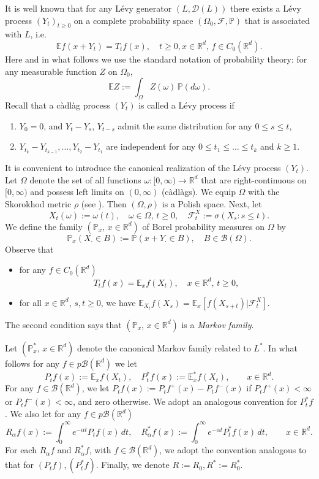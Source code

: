 \documentclass[11pt,a4paper,reqno]{amsart}
\newcommand{\FF}{{\mathcal  F}}
\theoremstyle{definition}
\numberwithin{equation}{section}
\begin{document}
It is well known that for any L\'evy generator $(L,\mathscr D(L))$ there exists a L\'evy process $(Y_t)_{t\ge 0}$
on a complete probability space $(\Omega_0,\mathcal F,\mathbb P)$ that is associated with  $L$, i.e.
\[
\mathbb Ef(x+Y_t)=T_tf(x),\quad t\ge 0,x\in\mathbb R^d,\, f\in C_0(\mathbb R^d).
\]
Here and in what follows we use the standard  notation of probability theory: 
 for any measurable function $Z$ on $\Omega_0$,
\[
\mathbb EZ:=\int_{\Omega}Z(\omega)\,\mathbb P(d\omega).
\]
Recall that a c\`adl\`ag process $(Y_t)$ is called a L\'evy process if
\begin{enumerate}
\item[(i)] $Y_0=0$, and   $Y_t-Y_s$,  $Y_{t-s}$ admit the same distribution  for any $0\le s\le t$,
\item[(ii)] $Y_{t_k}-Y_{t_{k-1}},\dots,Y_{t_2}-Y_{t_1}$ are independent for any $0\le t_1\le \dots\le t_k$ and $k\ge 1$.
\end{enumerate}
It is convenient  to introduce the canonical realization of the L\'evy process $(Y_t)$.
Let $\Omega$ denote the set of all functions $\omega:[0,\infty)\to \mathbb R^d$
that are  right-continuous on $[0,\infty)$ and possess left limits on $(0,\infty)$ (c\`adl\`ags).
We equip $\Omega$ with the Skorokhod metric $\rho$ (see  \cite[Section 12]{bil}). 
Then $(\Omega,\rho)$ is a Polish space.
Next, let 
\[
X_t(\omega):=\omega(t),\quad \omega\in \Omega,\, t\ge 0,\quad \mathcal F^X_t:=\sigma(X_s: s\le t).
\]
We define the family  $(\mathbb P_x,\, x\in \mathbb R^d)$ 
of Borel probability measures on $\Omega$ by
\[
\mathbb P_x(X_\cdot \in B):= \mathbb P(x+Y_\cdot\in B),\quad B\in\mathcal B(\Omega).
\]
Observe that 
\begin{itemize}
\item for any $f\in C_0(\mathbb R^d)$
\[
T_tf(x)=\mathbb E_xf(X_t),\quad x\in\mathbb R^d,\, t\ge 0,
\]
\item for all $x\in\mathbb R^d$, $s,t\ge 0$, we have  $\mathbb E_{X_t}f(X_s)=\mathbb E_x[f(X_{s+t})|\FF_t^X]$.
\end{itemize}
The second condition says that $(\mathbb P_x,\, x\in \mathbb R^d)$ is a {\em Markov family}.




Let $(\mathbb P^{*}_x,\, x\in \mathbb R^d)$ 
denote the canonical Markov family  related to $L^*$.
In what follows for   any  $f\in p\mathscr B(\mathbb R^d)$  we let
\[
P_tf(x):=\mathbb E_x f(X_t),\quad P^{*}_tf(x):=\mathbb E^{*}_x f(X_t),\qquad x\in \mathbb R^d.
\]
For any  $f\in\mathscr B(\mathbb R^d)$, we let
$P_tf(x):= P_tf^+(x)-P_tf^-(x)$ if $P_tf^+(x)<\infty$ or $P_tf^-(x)<\infty$, and zero otherwise.
We adopt   an analogous convention  for $P^{*}_tf$. 
We also let for any    $f\in p\mathscr B(\mathbb R^d)$
\[
R_\alpha f(x):= \int_0^\infty e^{-\alpha t} P_t f(x)\,dt, \quad R^{*}_\alpha f(x):= \int_0^\infty e^{-\alpha t} P^{*}_t f(x)\,dt,\qquad x\in \mathbb R^d.
\]
For each   $R_\alpha f$ and $R^{*}_\alpha f$, with $f\in\mathscr B(\mathbb R^d)$, we adopt the convention 
analogous to that for  $(P_tf), (P^{*}_tf)$.
Finally, we denote  $R:=R_0, R^{*}:=R^{*}_0$. 
\end{document}
